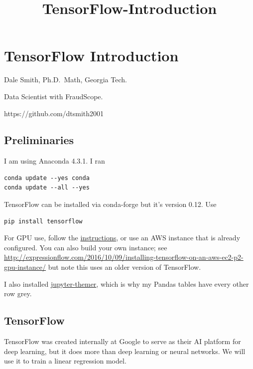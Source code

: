 \documentclass[11pt]{article}
\title{TensorFlow-Introduction}
\begin{document}
    
    
    \maketitle
    
    

    
    \hypertarget{tensorflow-introduction}{%
\section{TensorFlow Introduction}\label{tensorflow-introduction}}

Dale Smith, Ph.D.~Math, Georgia Tech.

Data Scientist with FraudScope.

https://github.com/dtsmith2001

\hypertarget{preliminaries}{%
\subsection{Preliminaries}\label{preliminaries}}

I am using Anaconda 4.3.1. I ran

\begin{verbatim}
conda update --yes conda
conda update --all --yes
\end{verbatim}

TensorFlow can be installed via conda-forge but it's version 0.12. Use

\begin{verbatim}
pip install tensorflow
\end{verbatim}

For GPU use, follow the
\href{https://www.tensorflow.org/install/}{instructions}, or use an AWS
instance that is already configured. You can also build your own
instance; see
\url{http://expressionflow.com/2016/10/09/installing-tensorflow-on-an-aws-ec2-p2-gpu-instance/}
but note this uses an older version of TensorFlow.

I also installed
\href{https://github.com/transcranial/jupyter-themer}{jupyter-themer},
which is why my Pandas tables have every other row grey.

\hypertarget{tensorflow}{%
\subsection{TensorFlow}\label{tensorflow}}

TensorFlow was created internally at Google to serve as their AI
platform for deep learning, but it does more than deep learning or
neural networks. We will use it to train a linear regression model.
\end{document}
